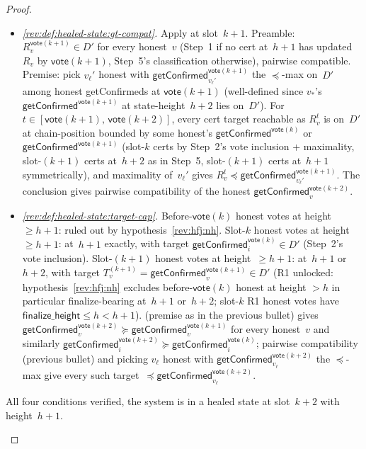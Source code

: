 \documentclass{article}
\newcommand{\finalizeHeight}{\mathsf{finalize\_height}}
\newcommand{\vote}{\mathsf{vote}}
\newcommand{\getConfirmed}{\textsf{getConfirmed}\xspace}
\theoremstyle{plain}
\theoremstyle{definition}
\theoremstyle{remark}
\begin{document}
\begin{proof}
\begin{description}
\begin{description}
\begin{itemize}
  \item \emph{\ref{rev:def:healed-state:gt-compat}.}
  Apply  at slot~$k+1$. Preamble: $R_v^{\vote(k+1)} \in D'$ for every honest~$v$ (Step~1 if no cert at~$h+1$ has updated~$R_v$ by $\vote(k+1)$, Step~5's classification otherwise), pairwise compatible. Premise: pick $v_\ell'$ honest with $\getConfirmed_{v_\ell'}^{\vote(k+1)}$ the $\preceq$-max on~$D'$ among honest \getConfirmed{}s at $\vote(k+1)$ (well-defined since $v_*$'s $\getConfirmed^{\vote(k+1)}$ at state-height~$h+2$ lies on~$D'$). For $t \in [\vote(k+1),\, \vote(k+2)]$, every cert target reachable as $R_v^t$ is on~$D'$ at chain-position bounded by some honest's $\getConfirmed^{\vote(k)}$ or $\getConfirmed^{\vote(k+1)}$ (slot-$k$ certs by Step~2's vote inclusion + maximality, slot-$(k+1)$ certs at~$h+2$ as in Step~5, slot-$(k+1)$ certs at~$h+1$ symmetrically), and maximality of~$v_\ell'$ gives $R_v^t \preceq \getConfirmed_{v_\ell'}^{\vote(k+1)}$. The conclusion gives pairwise compatibility of the honest $\getConfirmed_v^{\vote(k+2)}$.

  \item \emph{\ref{rev:def:healed-state:target-cap}.}
  Before-$\vote(k)$ honest votes at height~$\geq h+1$: ruled out by hypothesis~\ref{rev:hfj:nh}. Slot-$k$ honest votes at height~$\geq h+1$: at~$h+1$ exactly, with target $\getConfirmed_i^{\vote(k)} \in D'$ (Step~2's vote inclusion). Slot-$(k+1)$ honest votes at height~$\geq h+1$: at~$h+1$ or~$h+2$, with target $T_v^{(k+1)} = \getConfirmed_v^{\vote(k+1)} \in D'$ (R1 unlocked: hypothesis~\ref{rev:hfj:nh} excludes before-$\vote(k)$ honest at height $>h$ in particular finalize-bearing at~$h+1$ or~$h+2$; slot-$k$ R1 honest votes have $\finalizeHeight \leq h < h+1$).  (premise as in the previous bullet) gives $\getConfirmed_v^{\vote(k+2)} \succeq \getConfirmed_v^{\vote(k+1)}$ for every honest~$v$ and similarly $\getConfirmed_i^{\vote(k+2)} \succeq \getConfirmed_i^{\vote(k)}$; pairwise compatibility (previous bullet) and picking $v_\ell$ honest with $\getConfirmed_{v_\ell}^{\vote(k+2)}$ the $\preceq$-max give every such target~$\preceq \getConfirmed_{v_\ell}^{\vote(k+2)}$.
\end{itemize}
All four conditions verified, the system is in a healed state at slot~$k+2$ with height~$h+1$.
\end{description}
\end{description}
\end{proof}
\end{document}
